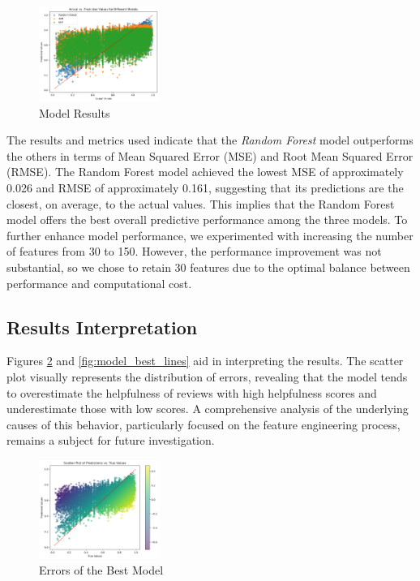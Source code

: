 \begin{figure}[H]
    \centering
    \includegraphics[width=0.35\textwidth]{./figures/model_results.png}
    \caption{Model Results}
    \label{fig:model_results}
\end{figure}

\noindent
The results and metrics used indicate that the \textit{Random Forest} model outperforms the others in terms of Mean Squared Error (MSE)
and Root Mean Squared Error (RMSE). The Random Forest model achieved the lowest MSE of approximately 0.026 and RMSE of approximately 0.161,
suggesting that its predictions are the closest, on average, to the actual values. This implies that the Random Forest model offers the
best overall predictive performance among the three models. To further enhance model performance, we experimented with increasing the
number of features from 30 to 150. However, the performance improvement was not substantial, so we chose to retain 30 features due to the
optimal balance between performance and computational cost.

\subsection*{Results Interpretation}
Figures \ref{fig:model_best_scatter} and \ref{fig:model_best_lines} aid in interpreting the results. The scatter plot visually represents
the distribution of errors, revealing that the model tends to overestimate the helpfulness of reviews with high helpfulness scores and
underestimate those with low scores. A comprehensive analysis of the underlying causes of this behavior, particularly focused on the
feature engineering process, remains a subject for future investigation.

\begin{figure}[H]
    \centering
    \includegraphics[width=0.35\textwidth]{./figures/model_best_scatter.png}
    \caption{Errors of the Best Model}
    \label{fig:model_best_scatter}
\end{figure}

